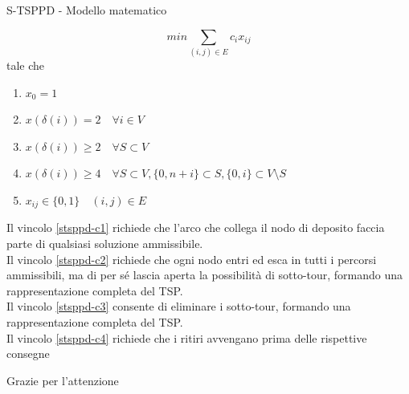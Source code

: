 \documentclass[9pt]{beamer}
\begin{document}
\begin{frame}{S-TSPPD - Modello matematico}

     	\[ min{ \sum_{(i,j) \in E} c_i x_{ij}} \]
	tale che
	\begin{enumerate}
		\item
		\label{stsppd-c1}
		$x_0 = 1$

		\item
		\label{stsppd-c2}
		$x(\delta(i)) = 2 \quad \forall i \in V$

		\item
		\label{stsppd-c3}
		$x(\delta(i)) \geq 2 \quad \forall S \subset V$
	
		\item
		\label{stsppd-c4}
		$x(\delta(i)) \geq 4 \quad \forall S \subset V, \{0, n+i\} \subset S, \{0,i\} \subset V \setminus S$

		\item
		$x_{ij} \in \{0,1\} \quad (i,j) \in E$
	\end{enumerate}
	
	\footnotesize
	Il vincolo \ref{stsppd-c1} richiede che l'arco che collega il nodo di deposito faccia parte di qualsiasi soluzione ammissibile. \\
	Il vincolo \ref{stsppd-c2} richiede che ogni nodo entri ed esca in tutti i percorsi ammissibili, ma di per sé lascia aperta la possibilità di sotto-tour, formando una rappresentazione completa del TSP. \\
	Il vincolo \ref{stsppd-c3} consente di eliminare i sotto-tour, formando una rappresentazione completa del TSP. \\
	Il vincolo \ref{stsppd-c4} richiede che i ritiri avvengano prima delle rispettive consegne
	

\end{frame}



\begin{frame}[standout]
Grazie per l'attenzione
\end{frame}
\end{document}
